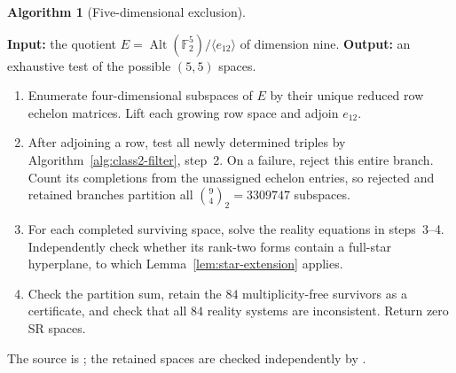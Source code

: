 \documentclass[11pt,a4paper]{amsart}
\theoremstyle{definition}
\newtheorem{algorithm}{Algorithm}
\theoremstyle{remark}
\DeclareMathOperator{\Alt}{Alt}
\numberwithin{equation}{section}
\begin{document}
\par\noindent\begin{minipage}{\linewidth}
\begin{algorithm}[Five-dimensional exclusion]\label{alg:small-exclusion}
\leavevmode\par
\textbf{Input:} the quotient
$E=\Alt(\mathbb F_2^5)/\langle e_{12}\rangle$ of dimension nine.
\textbf{Output:} an exhaustive test of the possible $(5,5)$ spaces.
\begin{enumerate}
\item Enumerate four-dimensional subspaces of $E$ by their unique
reduced row echelon matrices. Lift each growing row space and adjoin
$e_{12}$.
\item After adjoining a row, test all newly determined triples by
Algorithm~\ref{alg:class2-filter}, step~2. On a failure, reject this
entire branch. Count its completions from the unassigned echelon
entries, so rejected and retained branches partition all
$\binom94_2=3309747$ subspaces.
\item For each completed surviving space, solve the reality equations
in steps~3--4. Independently check whether its rank-two forms contain
a full-star hyperplane, to which Lemma~\ref{lem:star-extension} applies.
\item Check the partition sum, retain the $84$ multiplicity-free
survivors as a certificate, and check that all $84$ reality systems are
inconsistent. Return zero SR spaces.
\end{enumerate}
\end{algorithm}
\end{minipage}\par\medskip
The source is ; the retained spaces are checked
independently by .
\end{document}

